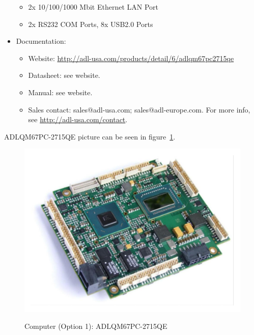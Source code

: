 \begin{itemize}
\begin{itemize}
    \item 2x 10/100/1000 Mbit Ethernet LAN Port
    \item 2x RS232 COM Ports, 8x USB2.0 Ports
  \end{itemize}
  \item Documentation:
  \begin{itemize}
    \item Website: \href{http://adl-usa.com/products/detail/6/adlqm67pc2715qe}{http://adl-usa.com/products/detail/6/adlqm67pc2715qe}
    \item Datasheet: see website.
    \item Manual: see website.
    \item Sales contact: sales@adl-usa.com; sales@adl-europe.com. For more info, see \href{http://adl-usa.com/contact}{http://adl-usa.com/contact}.
  \end{itemize}
\end{itemize}
ADLQM67PC-2715QE picture can be seen in figure~\ref{FIG:DEVICEPCOPTION1}.
\begin{figure}
  \centering
  \includegraphics[angle=90,width=1\columnwidth]{figs/body02/FIGDEVICEPCOPTION1.pdf}\\
  \caption[Computer (Option 1): ADLQM67PC-2715QE]{Computer (Option 1): ADLQM67PC-2715QE}
  \label{FIG:DEVICEPCOPTION1}
\end{figure}

